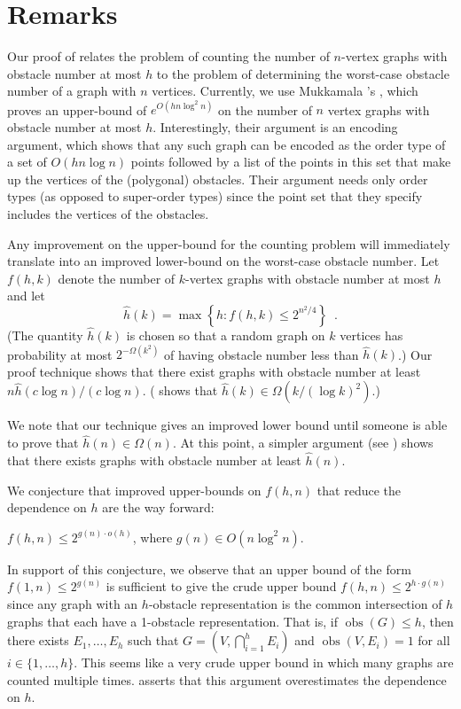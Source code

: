 \documentclass{patmorin}
\DeclareMathOperator{\obs}{obs}
\begin{document}
\section{Remarks}

Our proof of  relates the problem of counting the number
of $n$-vertex graphs with obstacle number at most $h$ to the problem of
determining the worst-case obstacle number of a graph with $n$ vertices.
Currently, we use Mukkamala \etal's , which proves an
upper-bound of $e^{O(hn\log^2 n)}$ on the number of $n$ vertex graphs
with obstacle number at most $h$.  Interestingly, their argument is an
encoding argument, which shows that any such graph can be encoded as the
order type of a set of $O(hn\log n)$ points followed by a list of the
points in this set that make up the vertices of the (polygonal) obstacles.
Their argument needs only order types (as opposed to super-order types)
since the point set that they specify includes the vertices of the
obstacles.

Any improvement on the upper-bound for the counting problem will
immediately translate into an improved lower-bound on the worst-case
obstacle number.  Let $f(h,k)$ denote the number of $k$-vertex graphs
with obstacle number at most $h$ and let 
\[  
   \hat h(k) = \max\left\{h:f(h,k) \le 2^{n^2/4}\right\} \enspace . 
\]
(The quantity $\hat h(k)$ is chosen so that a random graph
on $k$ vertices has probability at most $2^{-\Omega(k^2)}$ of having obstacle
number less than $\hat h(k)$.)
Our proof technique shows that
there exist graphs with obstacle number at least $n\hat{h}(c\log n)/(c\log
n)$. ( shows that $\hat{h}(k)\in\Omega(k/(\log k)^2)$.)

We note that our technique gives an improved lower bound until someone is
able to prove that $\hat h(n)\in\Omega(n)$.  At this point, a simpler
argument (see \cite[Theorem~3]{mukkamala.pach.ea:graphs}) shows that
there exists graphs with obstacle number at least $\hat{h}(n)$.

We conjecture that improved upper-bounds on $f(h,n)$ that reduce the
dependence on $h$ are the way forward:
\begin{conj}
  $f(h,n) \le 2^{g(n)\cdot o(h)}$, where $g(n)\in O(n\log^2 n)$.
\end{conj}
In support of this conjecture, we observe that an upper bound of the
form $f(1,n)\le 2^{g(n)}$ is sufficient to give the crude upper bound
$f(h,n)\le 2^{h\cdot g(n)}$ since any graph with an $h$-obstacle
representation is the common intersection of $h$ graphs that each
have a 1-obstacle representation.  That is, if $\obs(G)\le h$, then
there exists $E_1,\ldots,E_h$ such that $G=(V,\bigcap_{i=1}^h E_i)$
and $\obs(V,E_i)=1$ for all $i\in \{1,\ldots,h\}$.  This seems like a
very crude upper bound in which many graphs are counted multiple times.
 asserts that this argument overestimates the dependence on $h$.
\end{document}
